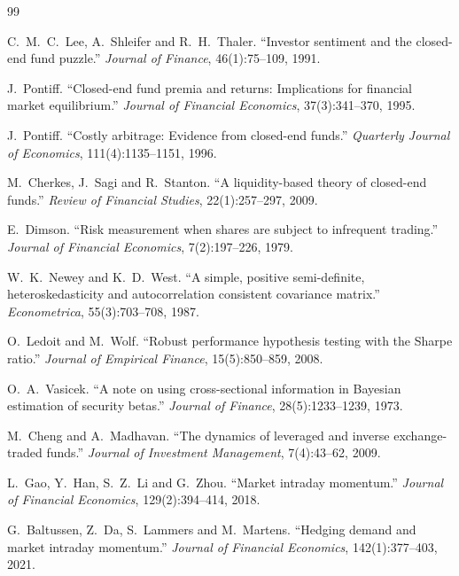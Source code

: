 \documentclass[10pt, a4paper, twocolumn]{article}
\begin{document}
\begin{thebibliography}{99}
\footnotesize
\setlength{\itemsep}{1pt}

C.~M.~C.\ Lee, A.~Shleifer and R.~H.\ Thaler.
\newblock ``Investor sentiment and the closed-end fund puzzle.''
\newblock \textit{Journal of Finance}, 46(1):75--109, 1991.

J.\ Pontiff.
\newblock ``Closed-end fund premia and returns: Implications for financial market equilibrium.''
\newblock \textit{Journal of Financial Economics}, 37(3):341--370, 1995.

J.\ Pontiff.
\newblock ``Costly arbitrage: Evidence from closed-end funds.''
\newblock \textit{Quarterly Journal of Economics}, 111(4):1135--1151, 1996.

M.\ Cherkes, J.\ Sagi and R.\ Stanton.
\newblock ``A liquidity-based theory of closed-end funds.''
\newblock \textit{Review of Financial Studies}, 22(1):257--297, 2009.

E.\ Dimson.
\newblock ``Risk measurement when shares are subject to infrequent trading.''
\newblock \textit{Journal of Financial Economics}, 7(2):197--226, 1979.

W.~K.\ Newey and K.~D.\ West.
\newblock ``A simple, positive semi-definite, heteroskedasticity and autocorrelation consistent covariance matrix.''
\newblock \textit{Econometrica}, 55(3):703--708, 1987.

O.\ Ledoit and M.\ Wolf.
\newblock ``Robust performance hypothesis testing with the Sharpe ratio.''
\newblock \textit{Journal of Empirical Finance}, 15(5):850--859, 2008.

O.~A.\ Vasicek.
\newblock ``A note on using cross-sectional information in Bayesian estimation of security betas.''
\newblock \textit{Journal of Finance}, 28(5):1233--1239, 1973.

M.\ Cheng and A.\ Madhavan.
\newblock ``The dynamics of leveraged and inverse exchange-traded funds.''
\newblock \textit{Journal of Investment Management}, 7(4):43--62, 2009.

L.\ Gao, Y.\ Han, S.~Z.\ Li and G.\ Zhou.
\newblock ``Market intraday momentum.''
\newblock \textit{Journal of Financial Economics}, 129(2):394--414, 2018.

G.\ Baltussen, Z.\ Da, S.\ Lammers and M.\ Martens.
\newblock ``Hedging demand and market intraday momentum.''
\newblock \textit{Journal of Financial Economics}, 142(1):377--403, 2021.


\end{thebibliography}
\end{document}
